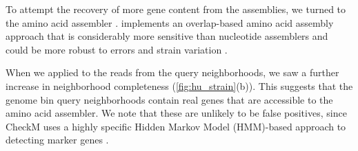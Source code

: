 To attempt the recovery of more gene content from the assemblies, we turned to
the \plass amino acid assembler \cite{plass}. \plass implements an
overlap-based amino acid assembly approach that is considerably more
sensitive than nucleotide assemblers and could be more robust to
errors and strain variation \cite{spa}.

When we applied \plass to the reads from the query neighborhoods, we saw
a further increase in neighborhood completeness
(\autoref{fig:hu_strain}(b)).  This suggests that the genome bin
query neighborhoods contain real genes that are accessible to the
\plass amino acid assembler.  We note that these are unlikely to be
false positives, since CheckM uses a highly specific Hidden Markov Model
(HMM)-based
approach to detecting marker genes \cite{CheckM}.

